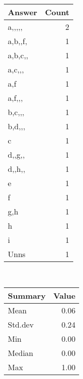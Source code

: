 \documentclass[12pt,english,nohyper]{tufte-handout}\usepackage[]{graphicx}\usepackage[]{color}
\begin{document}
\begin{center}%
\begin{tabular}{lr}
  \hline
Answer & Count \\ 
  \hline
a,,,,, &   2 \\ 
  a,b,,f, &   1 \\ 
  a,b,c,, &   1 \\ 
  a,c,,, &   1 \\ 
  a,f &   1 \\ 
  a,f,,, &   1 \\ 
  b,c,,, &   1 \\ 
  b,d,,, &   1 \\ 
  c &   1 \\ 
  d,,g,, &   1 \\ 
  d,,h,, &   1 \\ 
  e &   1 \\ 
  f &   1 \\ 
  g,h &   1 \\ 
  h &   1 \\ 
  i &   1 \\ 
  Unns &   1 \\ 
   \hline
\end{tabular}
~~~~~~~~%
\begin{tabular}{lr}
  \hline
Summary & Value \\ 
  \hline
Mean & 0.06 \\ 
  Std.dev & 0.24 \\ 
  Min & 0.00 \\ 
  Median & 0.00 \\ 
  Max & 1.00 \\ 
   \hline
\end{tabular}
\end{center}\newpage{}
\end{document}
